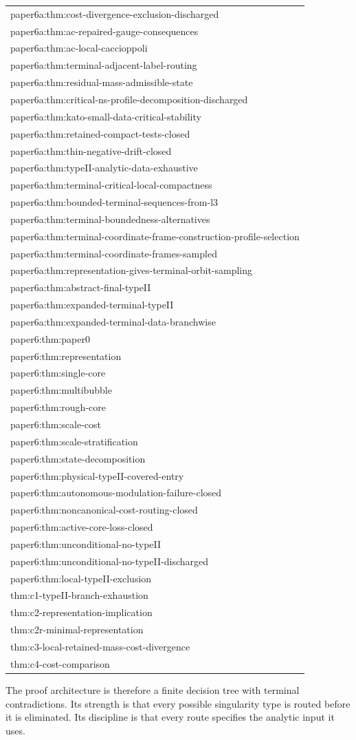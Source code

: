 \documentclass[11pt]{amsart}
\begin{document}
\begin{longtable}{@{}>{\ttfamily\footnotesize\raggedright\arraybackslash}p{}@{}}
paper6a:thm:cost-divergence-exclusion-discharged\\
paper6a:thm:ac-repaired-gauge-consequences\\
paper6a:thm:ac-local-caccioppoli\\
paper6a:thm:terminal-adjacent-label-routing\\
paper6a:thm:residual-mass-admissible-state\\
paper6a:thm:critical-ns-profile-decomposition-discharged\\
paper6a:thm:kato-small-data-critical-stability\\
paper6a:thm:retained-compact-tests-closed\\
paper6a:thm:thin-negative-drift-closed\\
paper6a:thm:typeII-analytic-data-exhaustive\\
paper6a:thm:terminal-critical-local-compactness\\
paper6a:thm:bounded-terminal-sequences-from-l3\\
paper6a:thm:terminal-boundedness-alternatives\\
paper6a:thm:terminal-coordinate-frame-construction-profile-selection\\
paper6a:thm:terminal-coordinate-frames-sampled\\
paper6a:thm:representation-gives-terminal-orbit-sampling\\
paper6a:thm:abstract-final-typeII\\
paper6a:thm:expanded-terminal-typeII\\
paper6a:thm:expanded-terminal-data-branchwise\\
paper6:thm:paper0\\
paper6:thm:representation\\
paper6:thm:single-core\\
paper6:thm:multibubble\\
paper6:thm:rough-core\\
paper6:thm:scale-cost\\
paper6:thm:scale-stratification\\
paper6:thm:state-decomposition\\
paper6:thm:physical-typeII-covered-entry\\
paper6:thm:autonomous-modulation-failure-closed\\
paper6:thm:noncanonical-cost-routing-closed\\
paper6:thm:active-core-loss-closed\\
paper6:thm:unconditional-no-typeII\\
paper6:thm:unconditional-no-typeII-discharged\\
paper6:thm:local-typeII-exclusion\\
thm:c1-typeII-branch-exhaustion\\
thm:c2-representation-implication\\
thm:c2r-minimal-representation\\
thm:c3-local-retained-mass-cost-divergence\\
thm:c4-cost-comparison\\
\bottomrule
\end{longtable}


The proof architecture is therefore a finite decision tree with terminal contradictions.  Its strength is that every possible singularity type is routed before it is eliminated.  Its discipline is that every route specifies the analytic input it uses.
\end{document}
